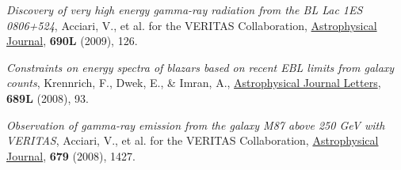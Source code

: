 \documentclass[9pt]{article}
\renewcommand{\section}[2]%
        {\pagebreak[2]\vspace{1.3\baselineskip}%
         \phantomsection\addcontentsline{toc}{section}{#1}%
         \hspace{0in}%
         \marginpar{
           \raggedright \scshape \bf \textcolor{superblue}{\large #1}}#2}
\newcommand{\blankline}{\quad\pagebreak[2]}
\begin{document}
{\blankline{}


\textit{Discovery of very high energy gamma-ray radiation from the BL Lac 1ES 0806+524}, Acciari, V., et al. for the VERITAS Collaboration, \underline{Astrophysical Journal}, \textbf{690L} (2009), 126.

 \blankline{}

 \textit{Constraints on energy spectra of blazars based on recent EBL limits from galaxy counts}, Krennrich, F., Dwek, E., \& Imran, A., \underline{Astrophysical Journal Letters}, \textbf{689L} (2008), 93.



\blankline{}

 \textit{Observation of gamma-ray emission from the galaxy M87 above 250 GeV with VERITAS}, Acciari, V., et al. for the VERITAS Collaboration, \underline{Astrophysical Journal}, \textbf{679} (2008), 1427.

 \blankline{}






}
\end{document}

